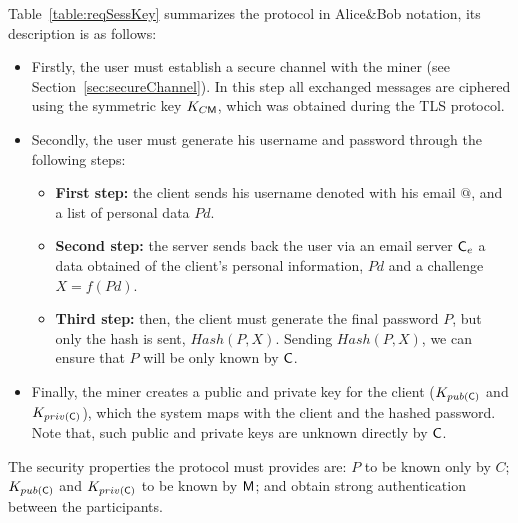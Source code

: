 Table~\ref{table:reqSessKey} summarizes the protocol
in Alice\&Bob notation, its description is as follows: 
\begin{itemize}
  \item Firstly, the user must establish a secure channel with the miner 
    (see Section~\ref{sec:secureChannel}). In this step all exchanged messages are ciphered 
    using the symmetric key $K_{C\textsf{M}}$, which was obtained during the TLS protocol. 
  \item Secondly, the user must generate
    his username and password through the following steps:
    \begin{itemize}
    \item \textbf{First step:} the client sends his username denoted with his email $@$, and  
        a list of personal data $Pd$. 
    \item \textbf{Second step:} the server sends back the user via an email server $\textsf{C}_e$ a 
        data obtained of the client's personal information, $Pd$ and a challenge $X=f(Pd)$. 
    \item \textbf{Third step:} then, the client must generate the final password $P$, but
      only the hash is sent, $Hash(P,X)$.  Sending $Hash(P,X)$, we can
      ensure that $P$ will be only known by $\textsf{C}$.  
    \end{itemize}
  \item Finally, the miner creates a public and private key for the client ($K_{pub(\textsf{C})}$ 
        and $K_{priv(\textsf{C})}$), which the system maps with the client and the hashed password. 
        Note that, such public and private keys are unknown directly by $\textsf{C}$. 
\end{itemize}




The security properties the protocol must provides are: $P$ to be
known only by $C$; $K_{pub(\textsf{C})}$ and $K_{priv(\textsf{C})}$ to be known by $\textsf{M}$; 
and obtain strong authentication between the participants.


